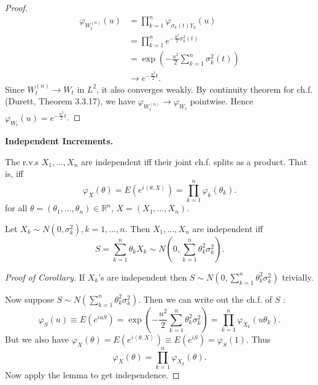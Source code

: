 \begin{proof}
	\begin{align*}
		\varphi_{W_t^{(n)}}(u)
		&= \prod_{k=1}^{n} \varphi_{\sigma_k(t) Y_k} (u)  \\
		&= \prod_{k=1}^{n} e^{- \frac{u^2}{2}\sigma_k^2(t)}  \\
		&= \exp\left( - \frac{u^2}{2} \sum_{k=1}^{n} \sigma_k^2(t) \right) \\
		&\to e^{- \frac{u^2}{2}t}
	.\end{align*}
	Since $W_t^{(n)}\to W_t$ in $L^2$, it also converges weakly. By continuity theorem for ch.f. (Durett, Theorem 3.3.17), we have $\varphi_{W_t^{(n)}} \to \varphi_{W_t}$ pointwise. Hence $\varphi_{W_t}(u) = e^{- \frac{u^2}{2}t}$.
\end{proof}

\textbf{Independent Increments.} 

\begin{lemma}
	\label{lem:independentChf}
	The r.v.s $X_1, \ldots, X_n$ are independent iff their joint ch.f. splits as a product. That is, iff
	\[
		\varphi_X(\theta) = E\left( e^{i \left\langle \theta, X \right\rangle } \right) = \prod_{k = 1}^{n} \varphi_k(\theta_k) 
	.\] 
	for all $\theta = \left( \theta_1, \ldots, \theta_n \right)  \in \mathbb{R}^n$, $X = \left( X_1, \ldots, X_n \right) $.
\end{lemma}

\begin{corollary}
	Let $X_k \sim N(0,\sigma_k^2), k = 1,\ldots, n$. Then $X_1, \ldots, X_n$ are independent iff
	\[
		S = \sum_{k=1}^{n} \theta_k X_k \sim N\left(0,\sum_{k=1}^{n} \theta_k^2 \sigma_k^2\right)
	.\] 
\end{corollary}
\begin{proof}[Proof of Corollary]
	If $X_k$'s are independent then $S\sim 
	N\left(0,\sum_{k=1}^{n} \theta_k^2 \sigma_k^2\right)$ trivially. 

	Now suppose $S \sim  N\left( \sum_{k=1}^{n} \theta_k^2 \sigma_k^2 \right) $. Then we can write out the ch.f. of $S$ :
	\[
		\varphi_S(u) \equiv E\left( e^{i u S} \right) = \exp\left( - \frac{u^2}{2} \sum_{k=1}^{n} \theta_k^2 \sigma_k^2 \right) 
		= \prod_{k = 1}^{n} \varphi_{X_k} (u \theta_k) 
	.\] 
	But we also have $\varphi_X(\theta) = E\left( e^{i \left\langle \theta, X \right\rangle } \right) \equiv E\left( e^{i S} \right) = \varphi_S(1)$. Thus
	\[
		\varphi_X(\theta) = \prod_{k=1}^{n} \varphi_{X_k}(\theta) 
	.\] 
	Now apply the lemma to get independence.
\end{proof}

